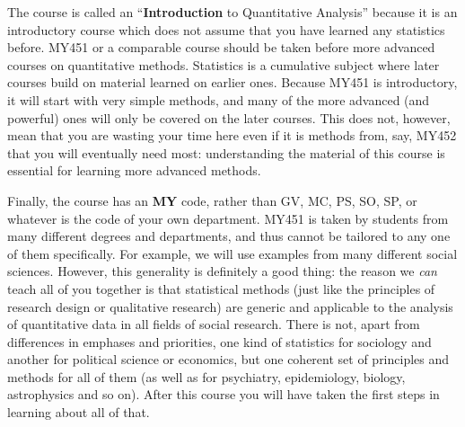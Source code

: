 The course is called an ``\textbf{Introduction} to Quantitative Analysis''
because it is an introductory course which does not assume
that you have learned any statistics before. MY451 or a comparable
course should be taken before more advanced
courses on quantitative methods. Statistics is a cumulative
subject where later courses build on material learned on earlier ones.
Because MY451 is introductory, it will start with very simple methods,
and many of the more advanced (and powerful) ones will only be covered
on the later courses. This does not, however, mean that you are wasting
your time here even if it is methods from, say, MY452 that you will
eventually need most: understanding the material of this course is
essential for learning more advanced methods.


Finally, the course has an \textbf{MY} code, rather than GV, MC, PS, SO,
SP, or whatever is the code of your own department. MY451
is taken by students from many different degrees and departments, and
thus cannot be tailored to any one of them specifically. For example, we
will use examples from many different social sciences. However, this
generality is definitely a good thing: the reason we \emph{can} teach
all of you together is that statistical methods (just like the
principles of research design or qualitative research) are generic and
applicable to the analysis of quantitative data in all fields of social
research. There is not, apart from differences in emphases and
priorities, one kind of statistics for sociology and another for political
science or economics, but one coherent set of principles and methods for
all of them (as well as for psychiatry, epidemiology, biology,
astrophysics and so on). After this course you will have taken the first
steps in learning about all of that.

